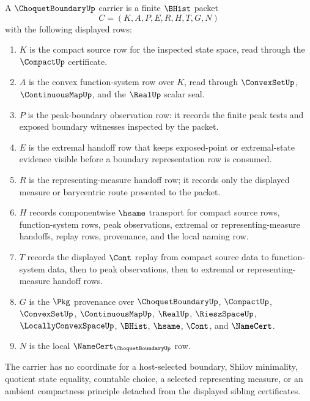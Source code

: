 \begin{definition}
\label{def:choquet-boundary-carrier}
A $\ChoquetBoundaryUp$ carrier is a finite $\BHist$ packet
$$
C=(K,A,P,E,R,H,T,G,N)
$$
with the following displayed rows:
\begin{enumerate}
\item $K$ is the compact source row for the inspected state space, read through the $\CompactUp$ certificate.
\item $A$ is the convex function-system row over $K$, read through $\ConvexSetUp$, $\ContinuousMapUp$, and the $\RealUp$ scalar seal.
\item $P$ is the peak-boundary observation row: it records the finite peak tests and exposed boundary witnesses inspected by the packet.
\item $E$ is the extremal handoff row that keeps exposed-point or extremal-state evidence visible before a boundary representation row is consumed.
\item $R$ is the representing-measure handoff row; it records only the displayed measure or barycentric route presented to the packet.
\item $H$ records componentwise $\hsame$ transport for compact source rows, function-system rows, peak observations, extremal or representing-measure handoffs, replay rows, provenance, and the local naming row.
\item $T$ records the displayed $\Cont$ replay from compact source data to function-system data, then to peak observations, then to extremal or representing-measure handoff rows.
\item $G$ is the $\Pkg$ provenance over $\ChoquetBoundaryUp$, $\CompactUp$, $\ConvexSetUp$, $\ContinuousMapUp$, $\RealUp$, $\RieszSpaceUp$, $\LocallyConvexSpaceUp$, $\BHist$, $\hsame$, $\Cont$, and $\NameCert$.
\item $N$ is the local $\NameCert_{\ChoquetBoundaryUp}$ row.
\end{enumerate}
The carrier has no coordinate for a host-selected boundary, Shilov minimality, quotient state equality, countable choice, a selected representing measure, or an ambient compactness principle detached from the displayed sibling certificates.
\end{definition}

